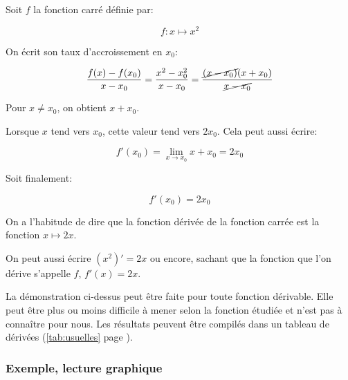 \documentclass[a4paper,12pt]{scrartcl}
\begin{document}
Soit $f$ la \og{}fonction carré\fg{} définie par:

\begin{equation*}
 f:x \longmapsto x^2
\end{equation*}

On écrit son taux d'accroissement en $x_0$:

\begin{equation*}
 \dfrac{f(x) - f(x_0)}{x - x_0} = \dfrac{x^2 - x_0^2}{x - x_0} = \dfrac{{\cancel{(x - x_0)}}(x + x_0)}{\cancel{x - x_0}}
\end{equation*}


Pour $x \neq x_0$, on obtient \underline{$x+x_0$}.

Lorsque $x$ tend vers $x_0$, cette valeur tend vers $2x_0$. Cela peut aussi écrire:

\begin{equation*}
 f'(x_0) = \lim_{x \rightarrow x_0} x + x_0 = 2x_0
\end{equation*}

Soit finalement:

\begin{equation*}
 f'(x_0) = 2x_0
\end{equation*}

On a l'habitude de dire que la fonction dérivée de la fonction carrée est la fonction $x \longmapsto 2x$. 

On peut aussi écrire $\left(x^2\right)' = 2x$ ou encore, sachant que la fonction que l'on dérive s'appelle $f$, $f'(x) = 2x$.

La démonstration ci-dessus peut être faite pour toute fonction dérivable. Elle peut être plus ou moins difficile à mener selon la fonction étudiée et n'est pas à connaître pour nous. Les résultats peuvent être compilés dans un tableau de dérivées (\cref{tab:usuelles} page \pageref{tab:usuelles}). 


\subsubsection{Exemple, lecture graphique}

\end{document}
